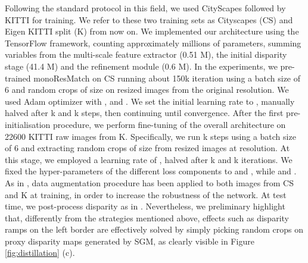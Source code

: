 \documentclass[10pt,twocolumn,letterpaper]{article}
\begin{document}
Following the standard protocol in this field, we used CityScapes followed by KITTI for training. We refer to these two training sets as Cityscapes (CS) and Eigen KITTI split (K) from now on. We implemented our architecture using the TensorFlow framework, counting approximately  millions of parameters, summing variables from the multi-scale feature extractor (0.51 M), the initial disparity stage (41.4 M) and the refinement module (0.6 M). 
In the experiments, we pre-trained monoResMatch on CS running about 150k iteration using a batch size of 6 and random crops of size  on  resized images from the original resolution. We used Adam optimizer \cite{kingma2014adam} with ,  and . We set the initial learning rate to , manually halved after k and k steps, then continuing until convergence. After the first pre-initialisation procedure, we perform fine-tuning of the overall architecture on 22600 KITTI raw images from K. Specifically, we run k steps using a batch size of 6 and extracting random crops of size  from resized images at  resolution. At this stage, we employed a learning rate of , halved after k and k iterations. We fixed the hyper-parameters of the different loss components to  and , while  and .
As in \cite{monodepth17}, data augmentation procedure has been applied to both images from CS and K at training, in order to increase the robustness of the network. At test time, we post-process disparity as in \cite{monodepth17,3net18,yang2018deep}. Nevertheless, we preliminary highlight that, differently from the strategies mentioned above, effects such as disparity ramps on the left border are effectively solved by simply picking random crops on proxy disparity maps generated by SGM, as clearly visible in Figure \ref{fig:distillation} (c).
\end{document}
